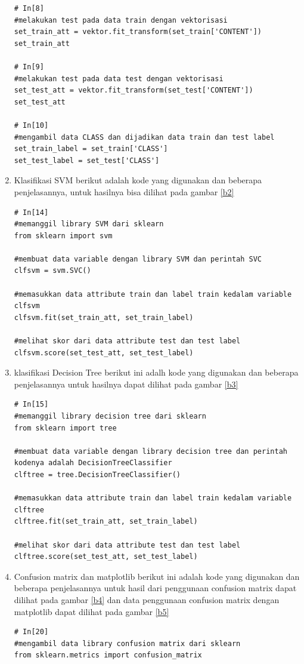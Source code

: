 \begin{enumerate}
\begin{verbatim}
# In[8]
#melakukan test pada data train dengan vektorisasi
set_train_att = vektor.fit_transform(set_train['CONTENT'])
set_train_att

# In[9]
#melakukan test pada data test dengan vektorisasi
set_test_att = vektor.fit_transform(set_test['CONTENT'])
set_test_att

# In[10]
#mengambil data CLASS dan dijadikan data train dan test label
set_train_label = set_train['CLASS']
set_test_label = set_test['CLASS']
\end{verbatim}

\item Klasifikasi SVM
\subitem berikut adalah kode yang digunakan dan beberapa penjelasannya, untuk hasilnya bisa dilihat pada gambar \ref{b2}
\begin{verbatim}
# In[14]
#memanggil library SVM dari sklearn
from sklearn import svm

#membuat data variable dengan library SVM dan perintah SVC
clfsvm = svm.SVC()

#memasukkan data attribute train dan label train kedalam variable clfsvm
clfsvm.fit(set_train_att, set_train_label)

#melihat skor dari data attribute test dan test label
clfsvm.score(set_test_att, set_test_label)
\end{verbatim}

\item klasifikasi Decision Tree 
\subitem berikut ini adalh kode yang digunakan dan beberapa penjelasannya untuk hasilnya dapat dilihat pada gambar \ref{b3}
\begin{verbatim}
# In[15]
#memanggil library decision tree dari sklearn
from sklearn import tree

#membuat data variable dengan library decision tree dan perintah kodenya adalah DecisionTreeClassifier
clftree = tree.DecisionTreeClassifier()

#memasukkan data attribute train dan label train kedalam variable clftree
clftree.fit(set_train_att, set_train_label)

#melihat skor dari data attribute test dan test label
clftree.score(set_test_att, set_test_label)
\end{verbatim}

\item Confusion matrix dan matplotlib
\subitem berikut ini adalah kode yang digunakan dan beberapa penjelasannya untuk hasil dari penggunaan confusion matrix dapat dilihat pada gambar \ref{b4} dan data penggunaan confusion matrix dengan matplotlib dapat dilihat pada gambar \ref{b5}
\begin{verbatim}
# In[20]
#mengambil data library confusion matrix dari sklearn
from sklearn.metrics import confusion_matrix


\end{verbatim}
\end{enumerate}
